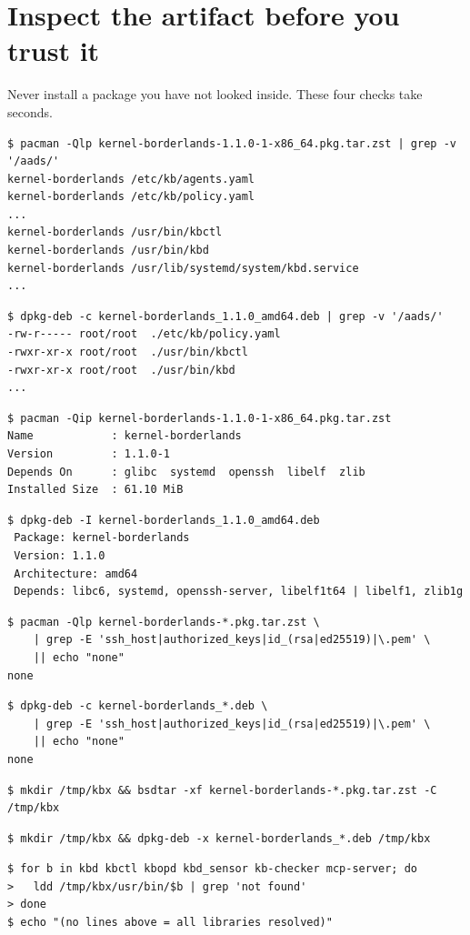 \section{Inspect the artifact before you trust it}
\label{sec:secrets}
Never install a package you have not looked inside. These four checks take seconds.

\resetsteps
{}
\ifarch
\begin{lstlisting}[style=console]
$ pacman -Qlp kernel-borderlands-1.1.0-1-x86_64.pkg.tar.zst | grep -v '/aads/'
kernel-borderlands /etc/kb/agents.yaml
kernel-borderlands /etc/kb/policy.yaml
...
kernel-borderlands /usr/bin/kbctl
kernel-borderlands /usr/bin/kbd
kernel-borderlands /usr/lib/systemd/system/kbd.service
...
\end{lstlisting}
\else
\begin{lstlisting}[style=console]
$ dpkg-deb -c kernel-borderlands_1.1.0_amd64.deb | grep -v '/aads/'
-rw-r----- root/root  ./etc/kb/policy.yaml
-rwxr-xr-x root/root  ./usr/bin/kbctl
-rwxr-xr-x root/root  ./usr/bin/kbd
...
\end{lstlisting}
\fi

\ifarch
\begin{lstlisting}[style=console]
$ pacman -Qip kernel-borderlands-1.1.0-1-x86_64.pkg.tar.zst
Name            : kernel-borderlands
Version         : 1.1.0-1
Depends On      : glibc  systemd  openssh  libelf  zlib
Installed Size  : 61.10 MiB
\end{lstlisting}
\else
\begin{lstlisting}[style=console]
$ dpkg-deb -I kernel-borderlands_1.1.0_amd64.deb
 Package: kernel-borderlands
 Version: 1.1.0
 Architecture: amd64
 Depends: libc6, systemd, openssh-server, libelf1t64 | libelf1, zlib1g
\end{lstlisting}
\fi

\ifarch
\begin{lstlisting}[style=console]
$ pacman -Qlp kernel-borderlands-*.pkg.tar.zst \
    | grep -E 'ssh_host|authorized_keys|id_(rsa|ed25519)|\.pem' \
    || echo "none"
none
\end{lstlisting}
\else
\begin{lstlisting}[style=console]
$ dpkg-deb -c kernel-borderlands_*.deb \
    | grep -E 'ssh_host|authorized_keys|id_(rsa|ed25519)|\.pem' \
    || echo "none"
none
\end{lstlisting}
\fi

\ifarch
\begin{lstlisting}[style=console]
$ mkdir /tmp/kbx && bsdtar -xf kernel-borderlands-*.pkg.tar.zst -C /tmp/kbx
\end{lstlisting}
\else
\begin{lstlisting}[style=console]
$ mkdir /tmp/kbx && dpkg-deb -x kernel-borderlands_*.deb /tmp/kbx
\end{lstlisting}
\fi
\begin{lstlisting}[style=console]
$ for b in kbd kbctl kbopd kbd_sensor kb-checker mcp-server; do
>   ldd /tmp/kbx/usr/bin/$b | grep 'not found'
> done
$ echo "(no lines above = all libraries resolved)"
\end{lstlisting}

